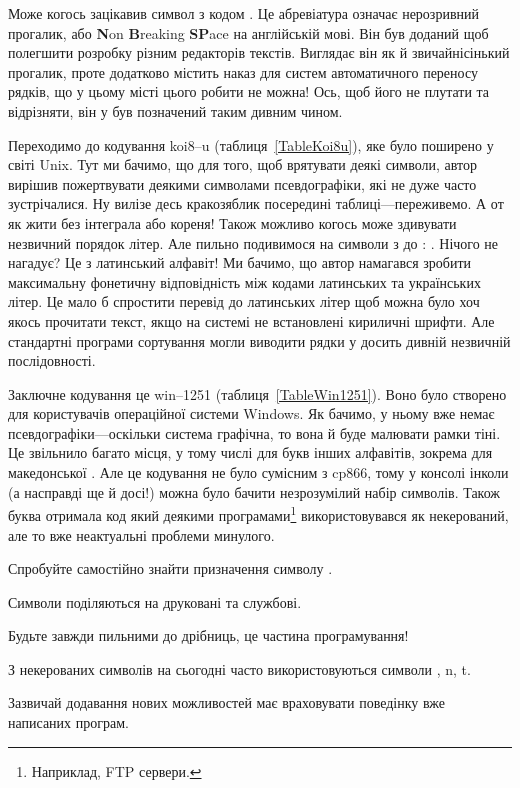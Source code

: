 Може когось зацікавив символ  з кодом .
Це абревіатура означає нерозривний прогалик, або \textbf{N}on \textbf{B}reaking \textbf{SP}ace на англійській мові.
Він був доданий щоб полегшити розробку різним редакторів текстів.
Виглядає він як й звичайнісінький прогалик, проте додатково містить наказ для систем автоматичного переносу рядків, що у цьому місті цього робити не можна!
Ось, щоб його не плутати та відрізняти, він у був позначений таким дивним чином.

Переходимо до кодування koi8--u (таблиця~\ref{TableKoi8u}), яке було поширено у світі Unix.
Тут ми бачимо, що для того, щоб врятувати деякі символи, автор вирішив пожертвувати деякими символами псевдографіки, які не дуже часто зустрічалися.
Ну вилізе десь кракозяблик посередині таблиці---переживемо.
А от як жити без інтеграла або кореня!
Також можливо когось може здивувати незвичний порядок літер.
Але пильно подивимося на символи з  до : .
Нічого не нагадує?
Це з латинський алфавіт!
Ми бачимо, що автор намагався зробити максимальну фонетичну відповідність між кодами латинських та українських літер.
Це мало б спростити перевід до латинських літер щоб можна було хоч якось прочитати текст, якщо на системі не встановлені кириличні шрифти.
Але стандартні програми сортування могли виводити рядки у досить дивній незвичній послідовності.

Заключне кодування це win--1251 (таблиця~\ref{TableWin1251}).
Воно було створено для користувачів операційної системи Windows.
Як бачимо, у ньому вже немає псевдографіки---оскільки система графічна, то вона й буде малювати рамки тіні.
Це звільнило багато місця, у тому числі для букв інших алфавітів, зокрема для македонської .
Але це кодування не було сумісним з cp866, тому у консолі інколи (а насправді ще й досі!) можна було бачити незрозумілий набір символів.
Також буква  отримала код  який деякими програмами\footnote{Наприклад, FTP сервери.} використовувався як некерований, але то вже неактуальні проблеми минулого.

\begin{exercise}
Спробуйте самостійно знайти призначення символу .
\end{exercise}

\begin{summary}
\item Символи поділяються на друковані та службові.
\item Будьте завжди пильними до дрібниць, це частина програмування!
\item З некерованих символів на сьогодні часто використовуються символи , \chesc n, \chesc t.
\item Зазвичай додавання нових можливостей має враховувати поведінку вже написаних програм.
\end{summary}

